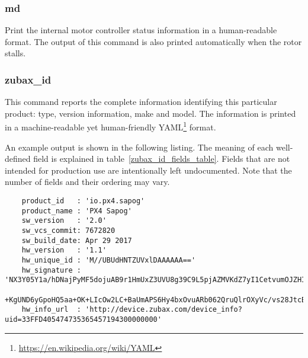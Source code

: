 \documentclass{zubaxdoc}
\begin{document}
\subsubsection{md}

Print the internal motor controller status information in a human-readable format.
The output of this command is also printed automatically when the rotor stalls.

\subsubsection{zubax\_id}\label{sec:cli_zubax_id}

This command reports the complete information identifying this particular product:
type, version information, make and model.
The information is printed in a machine-readable yet human-friendly
YAML\footnote{\url{https://en.wikipedia.org/wiki/YAML}} format.

An example output is shown in the following listing.
The meaning of each well-defined field is explained in table~\ref{zubax_id_fields_table}.
Fields that are not intended for production use are intentionally left undocumented.
Note that the number of fields and their ordering may vary.

\begin{verbatim}
	product_id   : 'io.px4.sapog'
	product_name : 'PX4 Sapog'
	sw_version   : '2.0'
	sw_vcs_commit: 7672820
	sw_build_date: Apr 29 2017
	hw_version   : '1.1'
	hw_unique_id : 'M//UBUdHNTZUVxlDAAAAAA=='
	hw_signature : 'NX3Y05Y1a/hDNajPyMF5dojuAB9r1HmUxZ3UVU8g39C9L5pjAZMVKdZ7yI1CetvumOJZHIjRYkHOBmMAEKvRU/3mpG\
	+KgUND6yGpoHQ5aa+OK+LIcOw2LC+BaUmAPS6Hy4bxOvuARb062QruQlrOXyVc/vs28JtcBzOZo/b/OxY='
	hw_info_url  : 'http://device.zubax.com/device_info?uid=33FFD405474735365457194300000000'
\end{verbatim}
\end{document}
